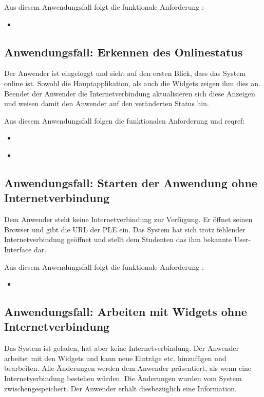 Aus diesem Anwendungsfall folgt die funktionale Anforderung :
\begin{itemize}
 \item \requirementf{\requirementDashboard}\label{requirementDashboard}
\end{itemize}

\subsection{Anwendungsfall: Erkennen des Onlinestatus}
Der Anwender ist eingeloggt und sieht auf den ersten Blick, dass das System online ist. Sowohl die Hauptapplikation, als auch die Widgets zeigen ihm dies an. Beendet der Anwender die Internetverbindung aktualisieren sich diese Anzeigen und weisen damit den Anwender auf den veränderten Status hin.
 
Aus diesem Anwendungsfall folgen die funktionalen Anforderung  und reqref{\requirementOnlineStatusInformUser}:
\begin{itemize}
 \item \requirementf{\requirementCheckOnlineStatus}\label{requirementCheckOnlineStatus}
 \item \requirementf{\requirementOnlineStatusInformUser}\label{requirementOnlineStatusInformUser}
\end{itemize}

\subsection{Anwendungsfall: Starten der Anwendung ohne Internetverbindung}
Dem Anwender steht keine Internetverbindung zur Verfügung. Er öffnet seinen Browser und gibt die URL der PLE ein. Das System hat sich trotz fehlender Internetverbindung geöffnet und stellt dem Studenten das ihm bekannte User-Interface dar.
 
Aus diesem Anwendungsfall folgt die funktionale Anforderung :
\begin{itemize}
 \item \requirementf{\requirementOfflineStart}\label{requirementOfflineStart}
\end{itemize}

\subsection{Anwendungsfall: Arbeiten mit Widgets ohne Internetverbindung}
Das System ist geladen, hat aber keine Internetverbindung. Der Anwender arbeitet mit den Widgets und kann neue Einträge etc. hinzufügen und bearbeiten. Alle Änderungen werden dem Anwender präsentiert, als wenn eine Internetverbindung bestehen würden. Die Änderungen wurden vom System zwischengespeichert. Der Anwender erhält diesbezüglich eine Information.

